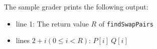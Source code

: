 The sample grader prints the following output:
\begin{itemize}
\item line 1: The return value $R$ of \texttt{findSwapPairs}
\item lines $2 + i (0 \le i < R)$: $P[i]\ Q[i]$
\end{itemize}